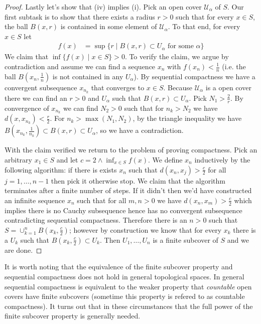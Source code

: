 \documentclass{amsart}
\theoremstyle{remark}
\theoremstyle{definition}
\begin{document}
\begin{proof}
Lastly let's show that (iv) implies (i).  Pick an open cover
$\mathcal{U}_\alpha$ of $S$.  Our first subtask is to show that there exists a
radius $r > 0$ such that for every $x \in S$, the ball $B(x,r)$ is contained in some
element of $\mathcal{U}_\alpha$.   To that end, for every $x \in S$ let 
\begin{align*}
f(x) &= \sup \lbrace r \mid B(x,r) \subset U_\alpha \text{ for some }
\alpha \rbrace
\end{align*}
We claim that $\inf \lbrace f(x) \mid x \in S \rbrace > 0$.  To verify
the claim, we argue by contradiction and assume we can find a sequence
$x_n$ with $f(x_n) < \frac{1}{n}$ (i.e. the ball $B(x_n, \frac{1}{n})$
is not contained in any $U_\alpha$). 
By sequential compactness we have a convergent subsequence $x_{n_k}$
that converges to $x \in S$.  Because $\mathcal{U}_\alpha$ is a open cover there we
can find an $r > 0$ and $U_\alpha$ such that $B(x, r) \subset
U_\alpha$.  Pick $N_1 > \frac{2}{r}$.  By convergence of $x_{n_k}$ we can find $N_2 > 0$ such that
for $n_k > N_2$ we have $d(x, x_{n_k}) < \frac{r}{2}$.  For $n_k >
\max(N_1, N_2)$, by the triangle inequality we have $B(x_{n_k},
\frac{1}{n_k}) \subset B(x,r) \subset U_\alpha$, so we have
a contradiction.

With the claim verified we return to the problem of proving
compactness.  Pick an arbitrary $x_1 \in S$ and let $c = 2 \wedge
\inf_{x \in S} f(x)$.  We define $x_n$ inductively by the following
algorithm: if there is exists $x_n$ such that $d(x_n, x_j) >
\frac{c}{2}$ for all $j=1, \dots, n-1$ then pick it otherwise stop.
We claim that the algorithm terminates after a finite number of
steps.  If it didn't then we'd have constructed an infinite sequence
$x_n$ such that for all $m,n > 0$ we have $d(x_n,x_m) > \frac{c}{2}$
which implies there is no Cauchy subsequence hence has no convergent
subsequence contradicting sequential compactness.  Therefore there is an $n>0$ such that $S = \cup_{k=1}^n
B(x_k, \frac{c}{2})$; however by construction we know that for every
$x_k$ there is a $U_k$ such that $B(x_k, \frac{c}{2}) \subset U_k$.
Then $U_1, \dots, U_n$ is a finite subcover of $S$ and we are done.
\end{proof}
It is worth noting that the equivalence of the finite subcover
property and sequential compactness does not hold in general
topological spaces.  In general sequential compactness is equivalent
to the weaker property that \emph{countable} open covers have finite
subcovers (sometime this property is refered to as countable
compactness).  It turns out that in these circumstances that the full
power of the finite subcover property is generally needed.
\end{document}
